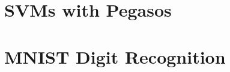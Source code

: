 \documentclass{article}
\begin{document}
\begin{multicols}{2}

\section{SVMs with Pegasos}


\section{MNIST Digit Recognition}


\end{multicols}
\end{document}
